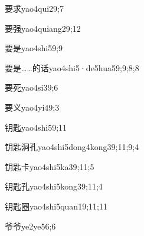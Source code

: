\begin{verbete}{要求}{yao4qui2}{9;7}
\end{verbete}

\begin{verbete}{要强}{yao4quiang2}{9;12}
\end{verbete}

\begin{verbete}{要是}{yao4shi5}{9;9}
\end{verbete}

\begin{verbete}{要是……的话}{yao4shi5·de5hua5}{9;9;8;8}
\end{verbete}

\begin{verbete}{要死}{yao4si3}{9;6}
\end{verbete}

\begin{verbete}{要义}{yao4yi4}{9;3}
\end{verbete}

\begin{verbete}{钥匙}{yao4shi5}{9;11}
\end{verbete}

\begin{verbete}{钥匙洞孔}{yao4shi5dong4kong3}{9;11;9;4}
\end{verbete}

\begin{verbete}{钥匙卡}{yao4shi5ka3}{9;11;5}
\end{verbete}

\begin{verbete}{钥匙孔}{yao4shi5kong3}{9;11;4}
\end{verbete}

\begin{verbete}{钥匙圈}{yao4shi5quan1}{9;11;11}
\end{verbete}

\begin{verbete}{爷爷}{ye2ye5}{6;6}
\end{verbete}

